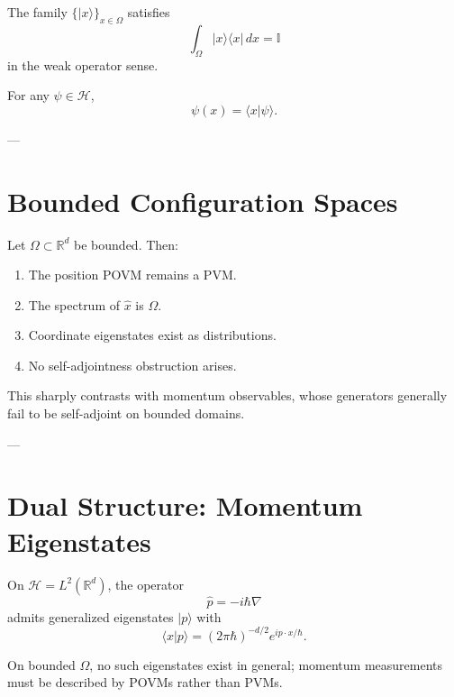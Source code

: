 \documentclass[11pt]{article}
\begin{document}
\begin{theorem}[Completeness]
The family $\{|x\rangle\}_{x\in\Omega}$ satisfies
\[
\int_\Omega |x\rangle\langle x|\,dx = \mathbb I
\]
in the weak operator sense.
\end{theorem}

\begin{corollary}
For any $\psi\in\mathcal H$,
\[
\psi(x) = \langle x|\psi\rangle .
\]
\end{corollary}

---

\section{Bounded Configuration Spaces}

\begin{theorem}
Let $\Omega\subset\mathbb R^d$ be bounded.
Then:
\begin{enumerate}
\item The position POVM remains a PVM.
\item The spectrum of $\hat x$ is $\Omega$.
\item Coordinate eigenstates exist as distributions.
\item No self-adjointness obstruction arises.
\end{enumerate}
\end{theorem}

\begin{remark}
This sharply contrasts with momentum observables, whose generators generally fail
to be self-adjoint on bounded domains.
\end{remark}

---

\section{Dual Structure: Momentum Eigenstates}

\begin{theorem}
On $\mathcal H=L^2(\mathbb R^d)$, the operator
\[
\hat p=-i\hbar\nabla
\]
admits generalized eigenstates $|p\rangle$ with
\[
\langle x|p\rangle=(2\pi\hbar)^{-d/2}e^{ip\cdot x/\hbar}.
\]
\end{theorem}

\begin{remark}
On bounded $\Omega$, no such eigenstates exist in general; momentum measurements must
be described by POVMs rather than PVMs.
\end{remark}
\end{document}
